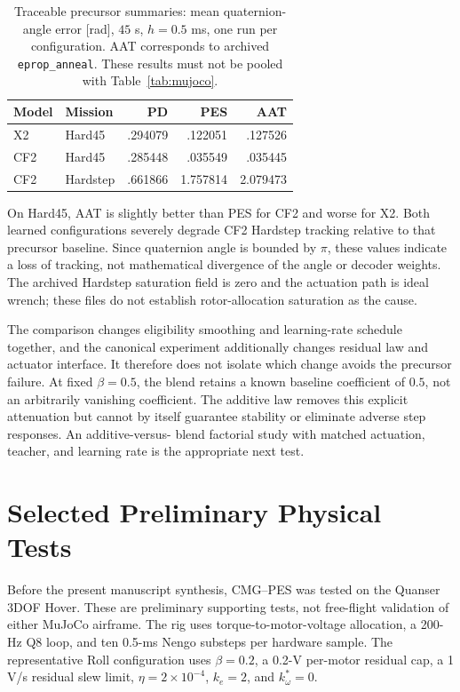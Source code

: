 \documentclass[letterpaper,10pt,conference]{IEEEtran}
\begin{document}
\begin{table}[t]
\caption{Traceable precursor summaries: mean quaternion-angle error [rad],
$45$ s, $h=0.5$ ms, one run per configuration. AAT corresponds to archived
\texttt{eprop\_anneal}. These results must not be pooled with
Table~\ref{tab:mujoco}.}
\label{tab:aat}\centering\small
\begin{tabular}{llrrr}
\toprule
Model&Mission&PD&PES&AAT\\\midrule
X2&Hard45&.294079&.122051&.127526\\
CF2&Hard45&.285448&.035549&.035445\\
CF2&Hardstep&.661866&1.757814&2.079473\\\bottomrule
\end{tabular}
\end{table}
On Hard45, AAT is slightly better than PES for CF2 and worse for X2.
Both learned configurations severely degrade CF2 Hardstep tracking relative
to that precursor baseline. Since quaternion angle is bounded by $\pi$,
these values indicate a loss of tracking, not mathematical divergence of
the angle or decoder weights. The archived Hardstep saturation field is
zero and the actuation path is ideal wrench; these files do not establish
rotor-allocation saturation as the cause.

The comparison changes eligibility smoothing and learning-rate schedule
together, and the canonical experiment additionally changes residual law
and actuator interface. It therefore does not isolate which change avoids
the precursor failure. At fixed $\beta=0.5$, the blend retains a known
baseline coefficient of $0.5$, not an arbitrarily vanishing coefficient.
The additive law removes this explicit attenuation but cannot by itself
guarantee stability or eliminate adverse step responses. An additive-versus-
blend factorial study with matched actuation, teacher, and learning rate
is the appropriate next test.

\section{Selected Preliminary Physical Tests}
\label{sec:hover}
Before the present manuscript synthesis, CMG--PES was tested on the Quanser
3DOF Hover. These are preliminary supporting tests, not free-flight
validation of either MuJoCo airframe. The rig uses torque-to-motor-voltage
allocation, a 200-Hz Q8 loop, and ten 0.5-ms Nengo substeps per hardware
sample. The representative Roll configuration uses $\beta=0.2$, a 0.2-V
per-motor residual cap, a 1 V/s residual slew limit, $\eta=2\times10^{-4}$,
$k_e=2$, and $k_\omega^*=0$.
\end{document}
